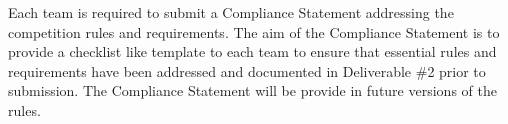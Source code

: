 Each team is required to submit a Compliance Statement addressing the competition rules and requirements. The aim of the Compliance Statement is to provide a checklist like template to each team to ensure that essential rules and requirements have been addressed and documented in Deliverable \#2 prior to submission. The Compliance Statement will be provide in future versions of the rules.